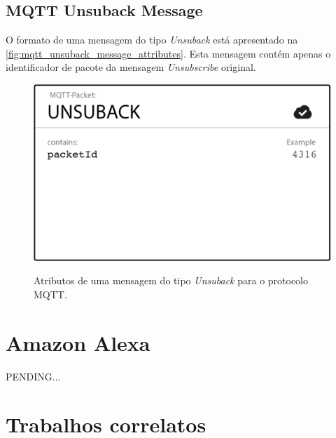 \subsection{MQTT Unsuback Message}\label{subsection:mqtt_unsuback_message}

O formato de uma mensagem do tipo \textit{Unsuback} está apresentado na \autoref{fig:mqtt_unsuback_message_attributes}. Esta mensagem contém apenas o identificador de pacote da mensagem \textit{Unsubscribe} original.

\begin{figure}[htbp]
	\centering
	\caption{Atributos de uma mensagem do tipo \textit{Unsuback} para o protocolo MQTT.}
	\includegraphics[scale=0.5]{Imagens/mqtt_unsuback_message_attributes.png}
	\label{fig:mqtt_unsuback_message_attributes}
\end{figure}

\section{Amazon Alexa}\label{section:amazon_alexa}

PENDING...

\section{Trabalhos correlatos}

